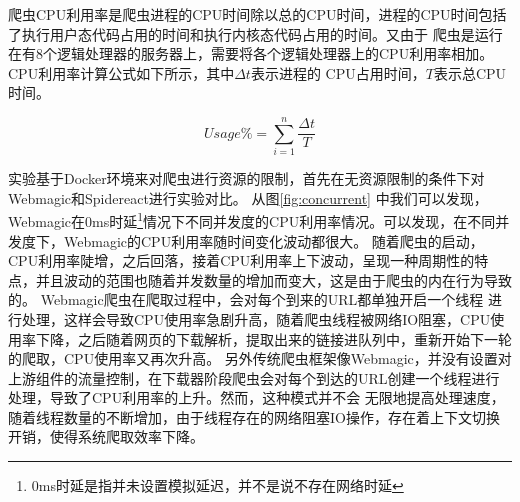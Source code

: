 \documentclass[master]{njuthesis}
\begin{document}
爬虫CPU利用率是爬虫进程的CPU时间除以总的CPU时间，进程的CPU时间包括了执行用户态代码占用的时间和执行内核态代码占用的时间。又由于
爬虫是运行在有8个逻辑处理器的服务器上，需要将各个逻辑处理器上的CPU利用率相加。CPU利用率计算公式如下所示，其中$\Delta t$表示进程的
CPU占用时间，$T$表示总CPU时间。

\begin{equation} 
  Usage\% = \sum_{i=1}^n \frac{\Delta t}{T}
\end{equation}

实验基于Docker环境来对爬虫进行资源的限制，首先在无资源限制的条件下对Webmagic和Spidereact进行实验对比。
从图\ref{fig:concurrent} 中我们可以发现，Webmagic在0ms时延\footnote{0ms时延是指并未设置模拟延迟，并不是说不存在网络时延}情况下不同并发度的CPU利用率情况。可以发现，在不同并发度下，Webmagic的CPU利用率随时间变化波动都很大。
随着爬虫的启动，CPU利用率陡增，之后回落，接着CPU利用率上下波动，呈现一种周期性的特点，并且波动的范围也随着并发数量的增加而变大，这是由于爬虫的内在行为导致的。
Webmagic爬虫在爬取过程中，会对每个到来的URL都单独开启一个线程
进行处理，这样会导致CPU使用率急剧升高，随着爬虫线程被网络IO阻塞，CPU使用率下降，之后随着网页的下载解析，提取出来的链接进队列中，重新开始下一轮的爬取，CPU使用率又再次升高。
另外传统爬虫框架像Webmagic，并没有设置对上游组件的流量控制，在下载器阶段爬虫会对每个到达的URL创建一个线程进行处理，导致了CPU利用率的上升。然而，这种模式并不会
无限地提高处理速度，随着线程数量的不断增加，由于线程存在的网络阻塞IO操作，存在着上下文切换开销，使得系统爬取效率下降。
\end{document}
